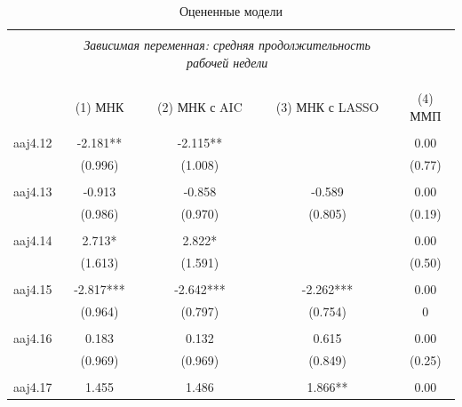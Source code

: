 \documentclass[12pt, a4paper]{article}
\begin{document}
{		
			\begin{longtable}{@{\extracolsep{5pt}}lcccc} 
				\caption{Оцененные модели} 
				\label{} 
				\\[-1.8ex]\hline 
				\hline \\[-1.8ex] 
				& \multicolumn{3}{c}{\textit{Зависимая переменная:  средняя продолжительность рабочей недели }} \\ 
				\cline{2-4} 
				\\[-1.8ex] & \multicolumn{4}{c}{ } \\ 
				\\[-1.8ex] & (1) МНК & (2) МНК с AIC & (3) МНК с LASSO & (4) ММП \\ 
				\hline \\[-1.8ex] 
				aaj4.12    & -2.181**   & -2.115**   &           & 0.00    \\
				& (0.996)    & (1.008)    &           & (0.77)  \\
				&            &            &           &         \\
				aaj4.13    & -0.913     & -0.858     & -0.589    & 0.00    \\
				& (0.986)    & (0.970)    & (0.805)   & (0.19)  \\
				&            &            &           &         \\
				aaj4.14    & 2.713*     & 2.822*     &           & 0.00    \\
				& (1.613)    & (1.591)    &           & (0.50)  \\
				&            &            &           &         \\
				aaj4.15    & -2.817***  & -2.642***  & -2.262*** & 0.00    \\
				& (0.964)    & (0.797)    & (0.754)   & 0       \\
				&            &            &           &         \\
				aaj4.16    & 0.183      & 0.132      & 0.615     & 0.00    \\
				& (0.969)    & (0.969)    & (0.849)   & (0.25)  \\
				&            &            &           &         \\
				aaj4.17    & 1.455      & 1.486      & 1.866**   & 0.00    \\

\end{longtable}}
\end{document}
